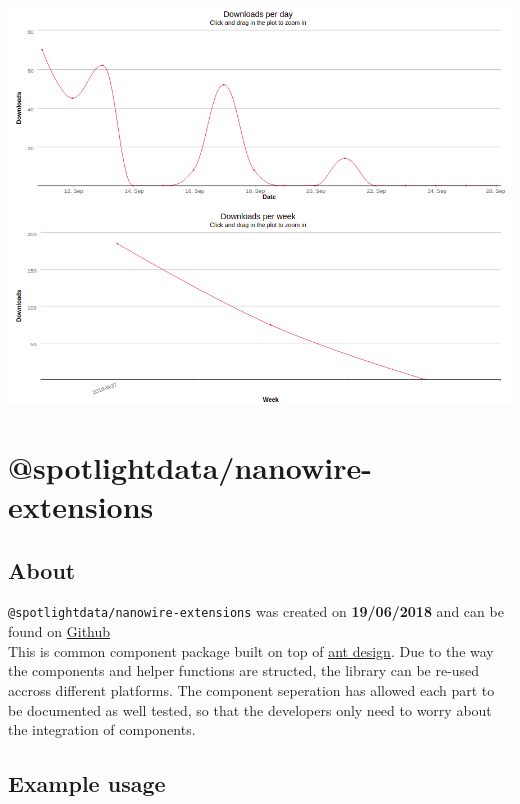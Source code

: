 \documentclass{article}
\begin{document}
\begin{center}
  \includegraphics[scale=0.5]{builder.png}
\end{center}

\newpage

\section{@spotlightdata/nanowire-extensions}

\subsection{About}
\begin{flushleft}
\texttt{@spotlightdata/nanowire-extensions} was created on \textbf{19/06/2018} and can be found on \href{https://github.com/SpotlightData/nanowire-extensions}{Github}\\
This is common component package built on top of \href{https://ant.design/docs/react/introduce}{ant design}. Due to the way the components and helper functions are structed, the library can be re-used accross different platforms. The component seperation has allowed each part to be documented as well tested, so that the developers only need to worry about the integration of components.
\end{flushleft}

\subsection{Example usage}
\end{document}
